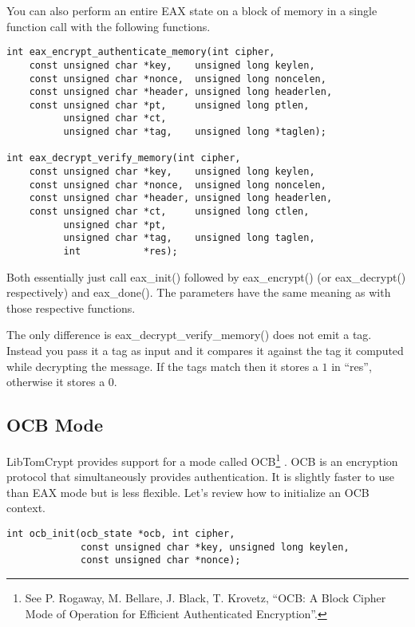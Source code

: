 \documentclass[a4paper]{book}
\begin{document}
You can also perform an entire EAX state on a block of memory in a single function call with the 
following functions.


 
\begin{verbatim}
int eax_encrypt_authenticate_memory(int cipher,
    const unsigned char *key,    unsigned long keylen,
    const unsigned char *nonce,  unsigned long noncelen,
    const unsigned char *header, unsigned long headerlen,
    const unsigned char *pt,     unsigned long ptlen,
          unsigned char *ct,
          unsigned char *tag,    unsigned long *taglen);

int eax_decrypt_verify_memory(int cipher,
    const unsigned char *key,    unsigned long keylen,
    const unsigned char *nonce,  unsigned long noncelen,
    const unsigned char *header, unsigned long headerlen,
    const unsigned char *ct,     unsigned long ctlen,
          unsigned char *pt,
          unsigned char *tag,    unsigned long taglen,
          int           *res);
\end{verbatim}

Both essentially just call eax\_init() followed by eax\_encrypt() (or eax\_decrypt() respectively) and eax\_done().  The parameters
have the same meaning as with those respective functions.  

The only difference is eax\_decrypt\_verify\_memory() does not emit a tag.  Instead you pass it a tag as input and it compares it against
the tag it computed while decrypting the message.  If the tags match then it stores a $1$ in ``res'', otherwise it stores a $0$.

\subsection{OCB Mode}
LibTomCrypt provides support for a mode called OCB\footnote{See 
P. Rogaway, M. Bellare, J. Black, T. Krovetz, ``OCB: A Block Cipher Mode of Operation for Efficient Authenticated Encryption''.}
.  OCB is an encryption protocol that simultaneously provides authentication.  It is slightly faster to use than EAX mode
but is less flexible.  Let's review how to initialize an OCB context.

\begin{verbatim}
int ocb_init(ocb_state *ocb, int cipher, 
             const unsigned char *key, unsigned long keylen, 
             const unsigned char *nonce);
\end{verbatim}
\end{document}
